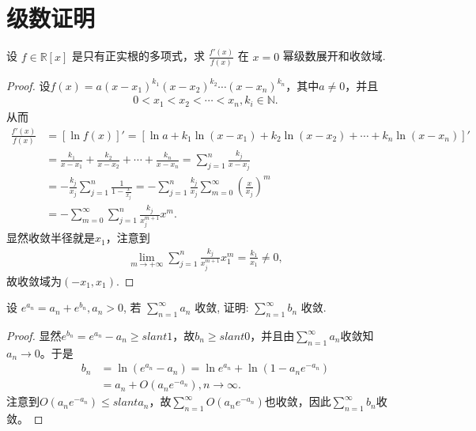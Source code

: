 \documentclass[../../main.tex]{subfiles}
\begin{document}
\section{级数证明}

\begin{example}
设 $f \in \mathbb{R}[x]$ 是只有正实根的多项式，求 $\frac{f'(x)}{f(x)}$ 在 $x = 0$ 幂级数展开和收敛域.
\end{example}
\begin{proof}
设$f(x) =a(x-x_1)^{k_1}(x-x_2)^{k_2}\cdots(x-x_n)^{k_n}$，其中$a\ne 0$，并且
\begin{align*}
0<x_1<x_2<\cdots <x_n,k_i\in \mathbb{N}.
\end{align*}
从而
\begin{align*}
\frac{f'(x)}{f(x)}&=\left[ \ln f(x) \right]'=\left[ \ln a+k_1\ln(x-x_1)+k_2\ln(x-x_2)+\cdots +k_n\ln(x-x_n) \right]' \\
&=\frac{k_1}{x-x_1}+\frac{k_2}{x-x_2}+\cdots +\frac{k_n}{x-x_n} =\sum\limits_{j=1}^n{\frac{k_j}{x-x_j}}\\
&=-\frac{k_j}{x_j}\sum\limits_{j=1}^n{\frac{1}{1-\frac{x}{x_j}}} =-\sum\limits_{j=1}^n{\frac{k_j}{x_j}\sum\limits_{m=0}^{\infty}{\left( \frac{x}{x_j} \right)^m}}\\
&=-\sum\limits_{m=0}^{\infty}{\sum\limits_{j=1}^n{\frac{k_j}{x_j^{m+1}}}x^m}.
\end{align*}
显然收敛半径就是$x_1$，注意到
\begin{align*}
\lim_{m\rightarrow +\infty}\sum_{j=1}^n{\frac{k_j}{x_j^{m+1}}}x_1^m=\frac{k_1}{x_1}\ne 0,
\end{align*}
故收敛域为$(-x_1,x_1)$.
\end{proof}

\begin{example}
设 $e^{a_n} = a_n + e^{b_n},a_n > 0$, 若 $\sum\limits_{n=1}^{\infty}a_n$ 收敛, 证明: $\sum\limits_{n=1}^{\infty}b_n$ 收敛.
\end{example}
\begin{proof}
显然$e^{b_n}=e^{a_n}-a_n\geqslant slant 1$，故$b_n\geqslant slant 0$，并且由$\sum_{n=1}^{\infty}a_n$收敛知$a_n\rightarrow 0$。于是
\begin{align*}
b_n&=\ln\left( e^{a_n}-a_n \right)=\ln e^{a_n}+\ln\left( 1-a_ne^{-a_n} \right)\\
&=a_n+O\left( a_ne^{-a_n} \right),n\rightarrow \infty.
\end{align*}
注意到$O\left( a_ne^{-a_n} \right)\leqslant slant a_n$，故$\sum_{n=1}^{\infty}O\left( a_ne^{-a_n} \right)$也收敛，因此$\sum_{n=1}^{\infty}b_n$收敛。
\end{proof}
\end{document}
